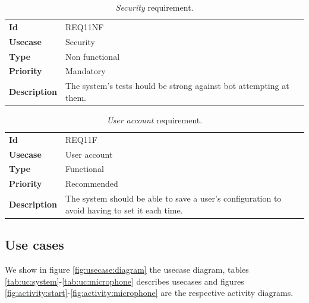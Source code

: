 \begin{table}[h!t]
    \centering
    \caption{\emph{Security} requirement.}
    \label{tab:req:security}
    \centering
    \begin{tabular}{l | p{80mm}}
        \textbf{Id}          & REQ11NF                                                            \\
        \textbf{Usecase}     & Security                                                           \\
        \textbf{Type}        & Non functional                                                     \\
        \textbf{Priority}    & Mandatory                                                          \\
        \textbf{Description} & The system's tests hould be strong against bot attempting at them.
    \end{tabular}
\end{table}

\begin{table}[h!t]
    \centering
    \caption{\emph{User account} requirement.}
    \label{tab:req:account}
    \centering
    \begin{tabular}{l | p{80mm}}
        \textbf{Id}          & REQ11F                                                                                        \\
        \textbf{Usecase}     & User account                                                                                  \\
        \textbf{Type}        & Functional                                                                                    \\
        \textbf{Priority}    & Recommended                                                                                   \\
        \textbf{Description} & The system should be able to save a user's configuration to avoid having to set it each time.
    \end{tabular}
\end{table}

\clearpage
\subsection{Use cases}
We show in figure \ref{fig:usecase:diagram} the usecase diagram, tables \ref{tab:uc:system}-\ref{tab:uc:microphone} describes usecases and figures \ref{fig:activity:start}-\ref{fig:activity:microphone} are the respective activity diagrams.

